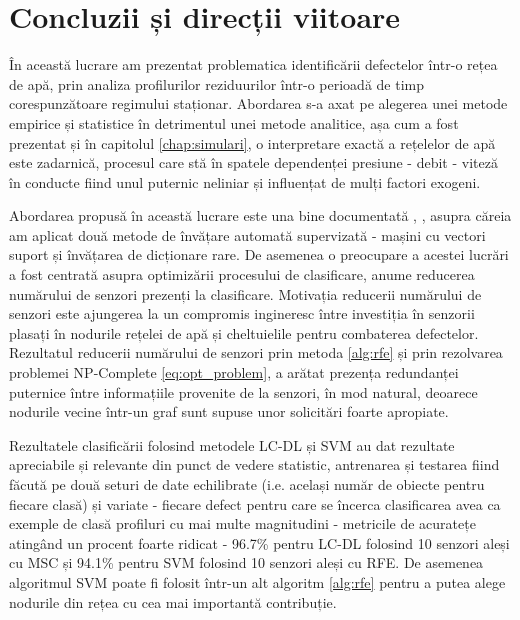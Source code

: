 \chapter{Concluzii și direcții viitoare}
\label{chap:conclusions}

În această lucrare am prezentat problematica identificării defectelor într-o rețea de apă, prin analiza profilurilor reziduurilor într-o perioadă de timp corespunzătoare regimului staționar. Abordarea s-a axat pe alegerea unei metode empirice și statistice în detrimentul unei metode analitice, așa cum a fost prezentat și în capitolul \ref{chap:simulari}, o interpretare exactă a rețelelor de apă este zadarnică, procesul care stă în spatele dependenței presiune - debit - viteză în conducte fiind unul puternic neliniar și influențat de mulți factori exogeni. 

Abordarea propusă în această lucrare este una bine documentată \cite{irofti2017dictionary}, \cite{perelman2016sensor}, \cite{rossman2000epanet} asupra căreia am aplicat două metode de învățare automată supervizată - mașini cu vectori suport și învățarea de dicționare rare. De asemenea o preocupare a acestei lucrări a fost centrată asupra optimizării procesului de clasificare, anume reducerea numărului de senzori prezenți la clasificare. Motivația reducerii numărului de senzori este ajungerea la un compromis ingineresc între investiția în senzorii plasați în nodurile rețelei de apă și cheltuielile pentru combaterea defectelor. Rezultatul reducerii numărului de senzori prin metoda \ref{alg:rfe} și prin rezolvarea problemei NP-Complete \ref{eq:opt_problem}, a arătat prezența redundanței puternice între informațiile provenite de la senzori, în mod natural, deoarece nodurile vecine într-un graf sunt supuse unor solicitări foarte apropiate.

Rezultatele clasificării folosind metodele LC-DL și SVM au dat rezultate apreciabile și relevante din punct de vedere statistic, antrenarea și testarea fiind făcută pe două seturi de date echilibrate (i.e. același număr de obiecte pentru fiecare clasă) și variate - fiecare defect pentru care se încerca clasificarea avea ca exemple de clasă profiluri cu mai multe magnitudini - metricile de acuratețe atingând un procent foarte ridicat - 96.7\% pentru LC-DL folosind 10 senzori aleși cu MSC și 94.1\% pentru SVM folosind 10 senzori aleși cu RFE. De asemenea algoritmul SVM poate fi folosit într-un alt algoritm \ref{alg:rfe} pentru a putea alege nodurile din rețea cu cea mai importantă contribuție.

